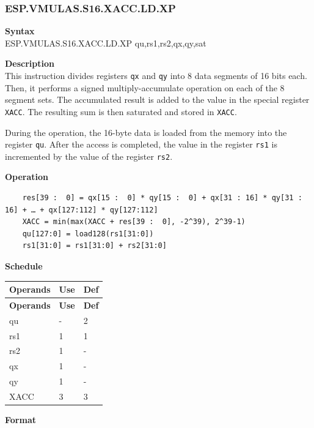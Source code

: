 \newpage
\subsubsection{ESP.VMULAS.S16.XACC.LD.XP}\label{instruction:ESPVMULASS16XACCLDXP}
\textbf{Syntax}\\
ESP.VMULAS.S16.XACC.LD.XP qu,rs1,rs2,qx,qy,sat

\textbf{Description}\\
This instruction divides registers \lstinline{qx} and \lstinline{qy} into 8 data segments of 16 bits each. Then, it performs a signed multiply-accumulate operation on each of the 8 segment sets. The accumulated result is added to the value in the special register \lstinline{XACC}. The resulting sum is then saturated and stored in \lstinline{XACC}.

During the operation, the 16-byte data is loaded from the memory into the register \lstinline{qu}. After the access is completed, the value in the register \lstinline{rs1} is incremented by the value of the register \lstinline{rs2}.

\textbf{Operation}\\
\begin{lstlisting}
    res[39 :  0] = qx[15 :  0] * qy[15 :  0] + qx[31 : 16] * qy[31 : 16] + … + qx[127:112] * qy[127:112]
    XACC = min(max(XACC + res[39 :  0], -2^39), 2^39-1)
    qu[127:0] = load128(rs1[31:0])
    rs1[31:0] = rs1[31:0] + rs2[31:0]
\end{lstlisting}

\textbf{Schedule}\\
\begin{longtable}[c]{|l|l|l|}
    \hline
    \rowcolor{lightgray}
    \textbf{Operands} & \textbf{Use} & \textbf{Def} \\\hline
    \endfirsthead
    \hline
    \rowcolor{lightgray}
     \textbf{Operands} & \textbf{Use} & \textbf{Def} \\\hline
    \endhead
    \hline
    \endfoot

    qu & - & 2 \\\hline
    rs1 & 1 & 1 \\\hline
    rs2 & 1 & - \\\hline
     qx & 1 & - \\\hline
     qy & 1 & - \\\hline
     XACC & 3 & 3
\end{longtable}

\textbf{Format}\\


